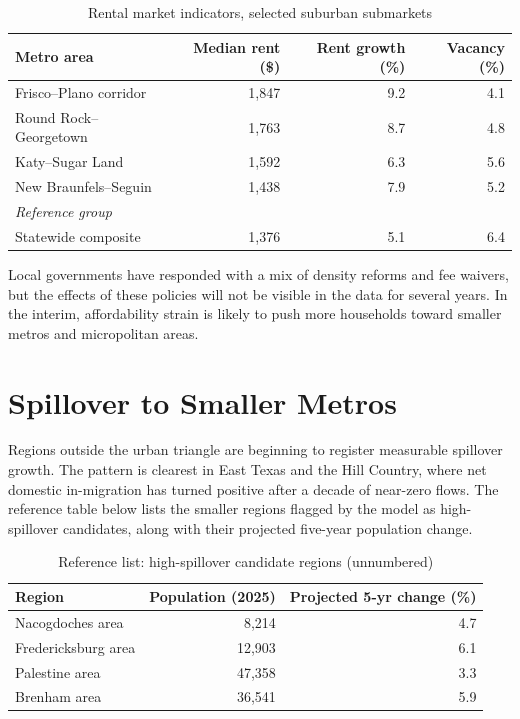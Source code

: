 \documentclass[11pt]{article}
\begin{document}
\begin{table}[htbp]
  \centering
  \begin{center}
  \begin{tabular}{lrrr}
    \toprule
    Metro area & Median rent (\$) & Rent growth (\%) & Vacancy (\%) \\
    \midrule
    Frisco--Plano corridor & 1{,}847 & 9.2 & 4.1 \\
    Round Rock--Georgetown & 1{,}763 & 8.7 & 4.8 \\
    Katy--Sugar Land & 1{,}592 & 6.3 & 5.6 \\
    New Braunfels--Seguin & 1{,}438 & 7.9 & 5.2 \\
    \multicolumn{4}{l}{\emph{Reference group}} \\
    Statewide composite & 1{,}376 & 5.1 & 6.4 \\
    \bottomrule
  \end{tabular}
  \end{center}
  \caption{Rental market indicators, selected suburban submarkets}
  \label{tab:housing}
\end{table}

Local governments have responded with a mix of density reforms and fee waivers,
but the effects of these policies will not be visible in the data for several
years. In the interim, affordability strain is likely to push more households
toward smaller metros and micropolitan areas.

\section{Spillover to Smaller Metros}
\label{sec:smaller}

Regions outside the urban triangle are beginning to register measurable
spillover growth. The pattern is clearest in East Texas and the Hill Country,
where net domestic in-migration has turned positive after a decade of
near-zero flows. The reference table below lists the smaller regions flagged
by the model as high-spillover candidates, along with their projected
five-year population change.

\begin{table}[htbp]
  \centering
  \begin{tabular}{lrr}
    \toprule
    Region & Population (2025) & Projected 5-yr change (\%) \\
    \midrule
    Nacogdoches area & 8{,}214 & 4.7 \\
    Fredericksburg area & 12{,}903 & 6.1 \\
    Palestine area & 47{,}358 & 3.3 \\
    Brenham area & 36{,}541 & 5.9 \\
    \bottomrule
  \end{tabular}
  \caption*{Reference list: high-spillover candidate regions (unnumbered)}
\end{table}
\end{document}
